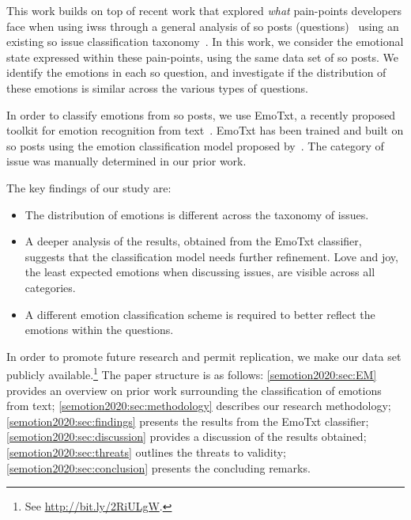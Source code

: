 This work builds on top of recent work that explored \textit{what} pain-points developers face when using \glspl{iws} through a general analysis of \SEMNumPostsFromSO{} \gls{so} posts (questions)~\citep{Cummaudo:2020icse} using an existing \gls{so} issue classification taxonomy~\citep{Beyer:2018fm}. In this work, we consider the emotional state expressed within these pain-points, using the same data set of \SEMNumPostsFromSO{} \gls{so} posts. We identify the emotions in each \gls{so} question, and investigate if the distribution of these emotions is similar across the various types of questions.

In order to classify emotions from \gls{so} posts, we use EmoTxt, a recently proposed toolkit for emotion recognition from text~\citep{novielli2018, calefato2017, calefato2018}. EmoTxt has been trained and built on \gls{so} posts using the emotion classification model proposed by~\citet{shaver1987}. The category of issue was manually determined in our prior work. 


The key findings of our study are:

\begin{itemize}
    \item The distribution of emotions is different across the taxonomy of issues.
    \item A deeper analysis of the results, obtained from the EmoTxt classifier, suggests that the classification model needs further refinement. Love and joy, the least expected emotions when discussing  issues, are visible across all categories.
    \item A different emotion classification scheme is required to better reflect the emotions within the questions.
\end{itemize}

In order to promote future research and permit replication, we make our data set publicly available.\footnote{See \url{http://bit.ly/2RiULgW}.} The paper structure is as follows: \cref{semotion2020:sec:EM} provides an overview on prior work surrounding the classification of emotions from text; \cref{semotion2020:sec:methodology} describes our research methodology;  \cref{semotion2020:sec:findings} presents the results from the EmoTxt classifier;  \cref{semotion2020:sec:discussion} provides a discussion of the results obtained;  \cref{semotion2020:sec:threats} outlines the threats to validity; \cref{semotion2020:sec:conclusion} presents the concluding remarks.  



